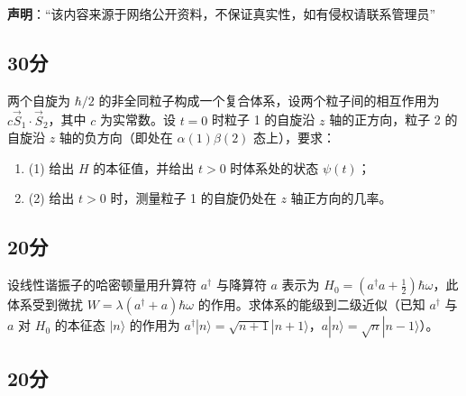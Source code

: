 
\textbf{声明}：“该内容来源于网络公开资料，不保证真实性，如有侵权请联系管理员”

\subsection{30分}
两个自旋为 $\hbar/2$ 的非全同粒子构成一个复合体系，设两个粒子间的相互作用为 $c\vec{S}_1 \cdot \vec{S}_2$，其中 $c$ 为实常数。设 $t=0$ 时粒子 1 的自旋沿 $z$ 轴的正方向，粒子 2 的自旋沿 $z$ 轴的负方向（即处在 $\alpha(1)\beta(2)$ 态上），要求：

\begin{enumerate}
    \item (1) 给出 $H$ 的本征值，并给出 $t > 0$ 时体系处的状态 $\psi(t)$；
    \item (2) 给出 $t > 0$ 时，测量粒子 1 的自旋仍处在 $z$ 轴正方向的几率。
\end{enumerate}
\subsection{20分}
设线性谐振子的哈密顿量用升算符 $a^\dagger$ 与降算符 $a$ 表示为 $H_0 = \left(a^\dagger a + \frac{1}{2}\right)\hbar\omega$，此体系受到微扰 $W = \lambda(a^\dagger + a)\hbar\omega$ 的作用。求体系的能级到二级近似（已知 $a^\dagger$ 与 $a$ 对 $H_0$ 的本征态 $|n\rangle$ 的作用为 $a^\dagger|n\rangle = \sqrt{n+1}|n+1\rangle$，$a|n\rangle = \sqrt{n}|n-1\rangle$）。
\subsection{20分}